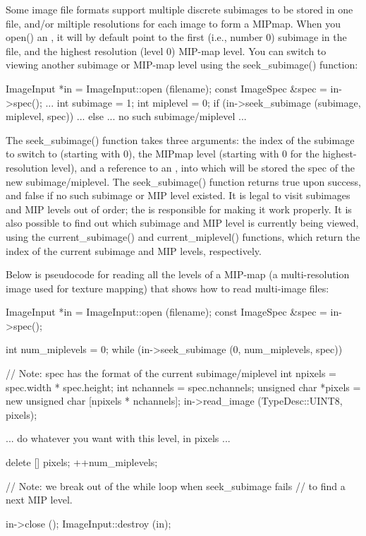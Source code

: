 Some image file formats support multiple discrete subimages to be stored
in one file, and/or miltiple resolutions for each image to form a
MIPmap.  When you {\cf open()} an \ImageInput, it will by default point
to the first (i.e., number 0) subimage in the file, and the highest
resolution (level 0) MIP-map level.  You can switch to viewing another
subimage or MIP-map level using the {\cf seek_subimage()} function:

\begin{code}
        ImageInput *in = ImageInput::open (filename);
        const ImageSpec &spec = in->spec();
        ...
        int subimage = 1;
        int miplevel = 0;
        if (in->seek_subimage (subimage, miplevel, spec)) {
            ...
        } else {
            ... no such subimage/miplevel ...
        }
\end{code}

The {\cf seek_subimage()} function takes three arguments: the index of
the subimage to switch to (starting with 0), the MIPmap level (starting
with 0 for the highest-resolution level), and a reference to an
\ImageSpec, into which will be stored the spec of the new
subimage/miplevel.  The {\cf seek_subimage()} function returns {\cf
  true} upon success, and {\cf false} if no such subimage or MIP level
existed.  It is legal to visit subimages and MIP levels out of order;
the \ImageInput is responsible for making it work properly.  It is also
possible to find out which subimage and MIP level is currently being
viewed, using the {\cf current_subimage()} and {\cf current_miplevel()}
functions, which return the index of the current subimage and MIP
levels, respectively.

Below is pseudocode for reading all the levels of a MIP-map (a
multi-resolution image used for texture mapping) that shows how to read
multi-image files:

\begin{code}
        ImageInput *in = ImageInput::open (filename);
        const ImageSpec &spec = in->spec();

        int num_miplevels = 0;
        while (in->seek_subimage (0, num_miplevels, spec)) {
            // Note: spec has the format of the current subimage/miplevel
            int npixels = spec.width * spec.height;
            int nchannels = spec.nchannels;
            unsigned char *pixels = new unsigned char [npixels * nchannels];
            in->read_image (TypeDesc::UINT8, pixels);

            ... do whatever you want with this level, in pixels ...

            delete [] pixels;
            ++num_miplevels;
        }
        // Note: we break out of the while loop when seek_subimage fails
        // to find a next MIP level.

        in->close ();
        ImageInput::destroy (in);
\end{code}

